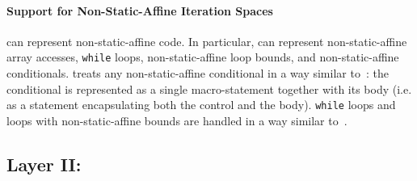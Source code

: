 

\paragraph{Support for Non-Static-Affine Iteration Spaces}

\framework can represent non-static-affine code.  In particular, \framework{} can represent non-static-affine array accesses, \texttt{while} loops, non-static-affine loop bounds, and non-static-affine conditionals.
\framework treats any non-static-affine conditional in a way similar to~\cite{pencil}: the conditional is represented as a single macro-statement together with its body (i.e. as a statement encapsulating both the control and the body).  \texttt{while} loops and loops with non-static-affine bounds are handled in a way similar to~\cite{Benabderrahmane}.






\vspace{-0.25cm}
\subsection{Layer II: \Layertwo}
\label{layer2}

